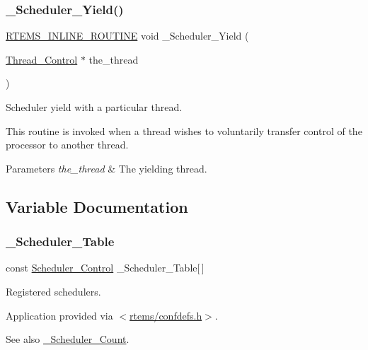\subsubsection{\texorpdfstring{\_Scheduler\_Yield()}{\_Scheduler\_Yield()}}
{\footnotesize\ttfamily \mbox{\hyperlink{group__RTEMSScoreBaseDefs_gac216239df231d5dbd15e3520b0b9313f}{R\+T\+E\+M\+S\+\_\+\+I\+N\+L\+I\+N\+E\+\_\+\+R\+O\+U\+T\+I\+NE}} void \+\_\+\+Scheduler\+\_\+\+Yield (\begin{DoxyParamCaption}\item[{\mbox{\hyperlink{struct__Thread__Control}{Thread\+\_\+\+Control}} $\ast$}]{the\+\_\+thread }\end{DoxyParamCaption})}



Scheduler yield with a particular thread. 

This routine is invoked when a thread wishes to voluntarily transfer control of the processor to another thread.


\begin{DoxyParams}{Parameters}
{\em the\+\_\+thread} & The yielding thread. \\
\hline
\end{DoxyParams}


\subsection{Variable Documentation}
\mbox{\label{group__RTEMSScoreScheduler_ga5810660559bc51e3083fe09f9b70878c}} 
\subsubsection{\texorpdfstring{\_Scheduler\_Table}{\_Scheduler\_Table}}
{\footnotesize\ttfamily const \mbox{\hyperlink{struct__Scheduler__Control}{Scheduler\+\_\+\+Control}} \+\_\+\+Scheduler\+\_\+\+Table\mbox{[}$\,$\mbox{]}}



Registered schedulers. 

Application provided via $<$\mbox{\hyperlink{confdefs_8h}{rtems/confdefs.\+h}}$>$.

\begin{DoxySeeAlso}{See also}
\mbox{\hyperlink{group__RTEMSScoreScheduler_ga31e91c7ee7890178b2292e5ecb7d75a7}{\+\_\+\+Scheduler\+\_\+\+Count}}. 
\end{DoxySeeAlso}
